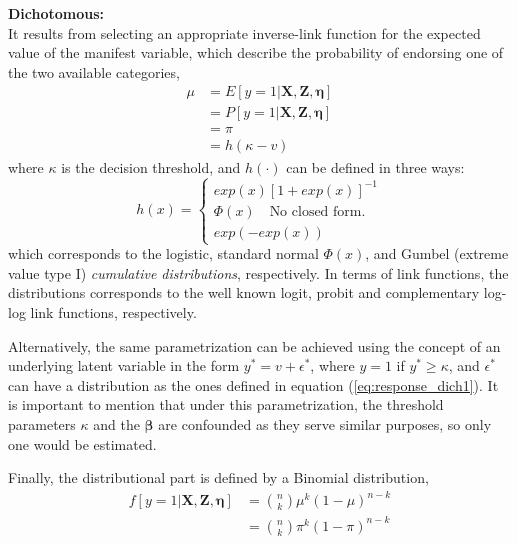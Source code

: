 \textbf{Dichotomous:} \\
	It results from selecting an appropriate inverse-link function for the expected value of the manifest variable, which describe the probability of endorsing one of the two available categories,
	\begin{equation} \label{eq:link_dich}
		\begin{split}
		\mu &= E[y=1 | \mathbf{X}, \mathbf{Z}, \pmb{\eta}] \\ 
		&= P[y=1 | \mathbf{X}, \mathbf{Z}, \pmb{\eta}] \\
		&= \pi \\
		&= h(\kappa - v)
		\end{split}	
	\end{equation}
	where $\kappa$ is the decision threshold, and $h(\cdot)$ can be defined in three ways:	
	\begin{equation} \label{eq:response_dich1}
		h(x) = 
		\begin{cases}
			exp(x)[1 + exp(x)]^{-1} \\
			\Phi(x) \quad \text{No closed form.} \\
			exp(-exp(x))
		\end{cases}
	\end{equation}
	which corresponds to the logistic, standard normal $\Phi(x)$, and Gumbel (extreme value type I) \textit{cumulative distributions}, respectively. In terms of link functions, the distributions corresponds to the well known logit, probit and complementary log-log link functions, respectively. 
	
	Alternatively, the same parametrization can be achieved using the concept of an underlying latent variable in the form $y^{*} = v + \epsilon^{*}$, where $y = 1$ if $y^{*} \ge \kappa$, and $\epsilon^{*}$ can have a distribution as the ones defined in equation (\ref{eq:response_dich1}). It is important to mention that under this parametrization, the threshold parameters $\kappa$ and the $\pmb{\beta}$ {\color{red} are confounded as they serve similar purposes, so only one would be estimated}.
	
	Finally, the distributional part is defined by a Binomial distribution,
	\begin{equation} \label{eq:dist_dich}
		\begin{split}
		f[y=1 | \mathbf{X}, \mathbf{Z}, \pmb{\eta}] &= \binom{n}{k} \mu^{k} (1-\mu)^{n-k} \\
		&= \binom{n}{k} \pi^{k} (1-\pi)^{n-k}
		\end{split}
	\end{equation}

